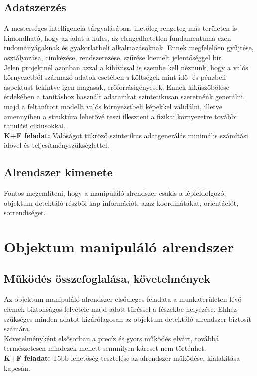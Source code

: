\documentclass{article}
\begin{document}
\subsection{Adatszerzés}
A mesterséges intelligencia tárgyalásában, illetőleg rengeteg más területen is kimondható, hogy
az adat a kulcs, az elengedhetetlen fundamentuma ezen tudományágaknak és gyakorlatbeli alkalmazásoknak.
Ennek megfelelően gyűjtése, osztályozása, címkézése, rendszerezése, szűrése kiemelt jelentőséggel bír.\\
Jelen projektnél azonban azzal a kihívással is szembe kell néznünk, hogy a valós környezetből
származó adatok esetében a költségek mint idő- és pénzbeli aspektust tekintve igen magasak, erőforrásigényesek.
Ennek kiküszöbölése érdekében a tanításhoz használt adatainkat szintetikusan szeretnénk generálni,
majd a feltanított modellt valós környezetbeli képekkel validálni, illetve amennyiben a struktúra
lehetővé teszi illeszteni a fizikai környezetre további tanulási ciklusokkal.\vspace{5pt}\\
\textbf{K+F feladat: }Valóságot tükröző szintetikus adatgenerálás minimális számítási idővel és teljesítményszükséglettel.
\subsection{Alrendszer kimenete}
Fontos megemlíteni, hogy a manipuláló alrendszer csakis a lépfeldolgozó, objektum detektáló
részből kap információt, azaz koordinátákat, orientációt, sorrendiséget.

\section{Objektum manipuláló alrendszer}
\subsection{Működés összefoglalása, követelmények}
Az objektum manipuláló alrendszer elsődleges feladata a munkaterületen lévő elemek biztonságos
felvétele majd adott tűréssel a fészekbe helyezése. Ehhez szükséges minden adatot kizárólagosan az objektum
detektáló alrendszer biztosít számára.\\
Követelményként elsősorban a precíz és gyors működés elvárt, továbbá természetesen mindezek mellett
semmilyen káreset nem történhet.\\
\textbf{K+F feladat: }Több lehetőség tesztelése az alrendszer működése, kialakítása kapcsán.
\end{document}
